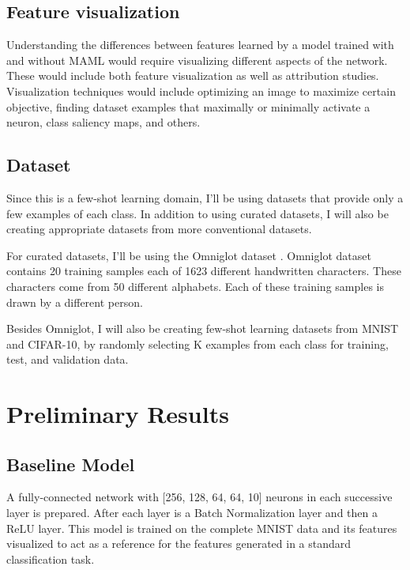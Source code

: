 \documentclass[10pt,twocolumn,letterpaper]{article}
\begin{document}
\subsection{Feature visualization}

Understanding the differences between features learned by a model trained with and without MAML would require visualizing different aspects of the network. These would include both feature visualization as well as attribution studies. Visualization techniques would include optimizing an image to maximize certain objective, finding dataset examples that maximally or minimally activate a neuron, class saliency maps, and others. \cite{olah2017feature}

\subsection{Dataset}

Since this is a few-shot learning domain, I'll be using datasets that provide only a few examples of each class. In addition to using curated datasets, I will also be creating appropriate datasets from more conventional datasets.

For curated datasets, I'll be using the Omniglot dataset \cite{lake2015human}. Omniglot dataset contains 20 training samples each of 1623 different handwritten characters. These characters come from 50 different alphabets. Each of these training samples is drawn by a different person.

Besides Omniglot, I will also be creating few-shot learning datasets from MNIST and CIFAR-10, by randomly selecting K examples from each class for training, test, and validation data.


\section{Preliminary Results}

\subsection{Baseline Model}

A fully-connected network with [256, 128, 64, 64, 10] neurons in each successive layer is prepared. After each layer is a Batch Normalization layer and then a ReLU layer. This model is trained on the complete MNIST data and its features visualized to act as a reference for the features generated in a standard classification task.
\end{document}
